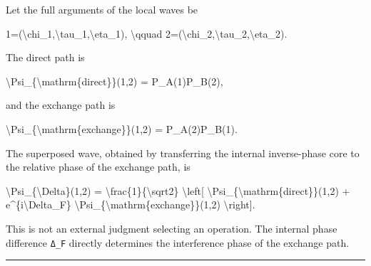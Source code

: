 \documentclass[
  a4paper,
]{article}
\newenvironment{Shaded}{}{}
\newcommand{\NormalTok}[1]{#1}
\begin{document}
Let the full arguments of the local waves be

\begin{Shaded}
\begin{Highlighting}[]
\NormalTok{1=(\textbackslash{}chi\_1,\textbackslash{}tau\_1,\textbackslash{}eta\_1),}
\NormalTok{\textbackslash{}qquad}
\NormalTok{2=(\textbackslash{}chi\_2,\textbackslash{}tau\_2,\textbackslash{}eta\_2).}
\end{Highlighting}
\end{Shaded}

The direct path is

\begin{Shaded}
\begin{Highlighting}[]
\NormalTok{\textbackslash{}Psi\_\{\textbackslash{}mathrm\{direct\}\}(1,2)}
\NormalTok{=}
\NormalTok{P\_A(1)P\_B(2),}
\end{Highlighting}
\end{Shaded}

and the exchange path is

\begin{Shaded}
\begin{Highlighting}[]
\NormalTok{\textbackslash{}Psi\_\{\textbackslash{}mathrm\{exchange\}\}(1,2)}
\NormalTok{=}
\NormalTok{P\_A(2)P\_B(1).}
\end{Highlighting}
\end{Shaded}

The superposed wave, obtained by transferring the internal inverse-phase
core to the relative phase of the exchange path, is

\begin{Shaded}
\begin{Highlighting}[]
\NormalTok{\textbackslash{}Psi\_\{\textbackslash{}Delta\}(1,2)}
\NormalTok{=}
\NormalTok{\textbackslash{}frac\{1\}\{\textbackslash{}sqrt2\}}
\NormalTok{\textbackslash{}left[}
\NormalTok{\textbackslash{}Psi\_\{\textbackslash{}mathrm\{direct\}\}(1,2)}
\NormalTok{+}
\NormalTok{e\^{}\{i\textbackslash{}Delta\_F\}}
\NormalTok{\textbackslash{}Psi\_\{\textbackslash{}mathrm\{exchange\}\}(1,2)}
\NormalTok{\textbackslash{}right].}
\end{Highlighting}
\end{Shaded}

This is not an external judgment selecting an operation. The internal
phase difference \texttt{Δ\_F} directly determines the interference
phase of the exchange path.

\begin{center}\rule{0.5\linewidth}{0.5pt}\end{center}
\end{document}
